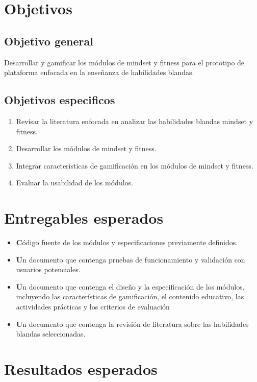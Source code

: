 \section{Objetivos}

\subsection{Objetivo general}
Desarrollar y gamificar los módulos de mindset y fitness para el prototipo de plataforma enfocada en la enseñanza de habilidades blandas.

\subsection{Objetivos especificos}
\begin{enumerate}
    \item Revisar la literatura enfocada en analizar las habilidades blandas mindset y fitness.
    
    \item Desarrollar los módulos de mindset y fitness.
    
    \item Integrar características de gamificación en los módulos de mindset y fitness.
    
    \item Evaluar la usabilidad de los módulos.
    
\end{enumerate}
\section{Entregables esperados}
\begin{itemize}
\item \textbf
Código fuente de los módulos y especificaciones previamente definidos.
\item \textbf
Un documento que contenga pruebas de funcionamiento y validación con usuarios potenciales.
\item \textbf
Un documento que contenga el diseño y la especificación de los módulos, incluyendo las características de gamificación, el contenido educativo, las actividades prácticas y los criterios de evaluación
\item \textbf
Un documento que contenga la revisión de literatura sobre las habilidades blandas seleccionadas.
\end{itemize}

\section{Resultados esperados}

